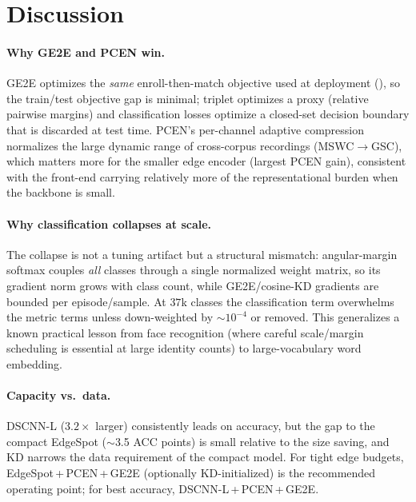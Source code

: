 \documentclass[10pt,twocolumn]{article}
\begin{document}
\section{Discussion}\label{sec:discuss}

\paragraph{Why GE2E and PCEN win.}
GE2E optimizes the \emph{same} enroll-then-match objective used at deployment
(), so the train/test objective gap is minimal; triplet
optimizes a proxy (relative pairwise margins) and classification losses optimize
a closed-set decision boundary that is discarded at test time. PCEN's
per-channel adaptive compression normalizes the large dynamic range of
cross-corpus recordings (MSWC$\to$GSC), which matters more for the smaller edge
encoder (largest PCEN gain), consistent with the front-end carrying relatively
more of the representational burden when the backbone is small.

\paragraph{Why classification collapses at scale.}
The collapse is not a tuning artifact but a structural mismatch: angular-margin
softmax couples \emph{all} classes through a single normalized weight matrix, so
its gradient norm grows with class count, while GE2E/cosine-KD gradients are
bounded per episode/sample. At $37$k classes the classification term overwhelms
the metric terms unless down-weighted by $\sim$$10^{-4}$ or removed. This
generalizes a known practical lesson from face recognition (where careful
scale/margin scheduling is essential at large identity counts) to large-vocabulary
word embedding.

\paragraph{Capacity vs.\ data.}
DSCNN-L ($3.2\times$ larger) consistently leads on accuracy, but the gap to the
compact EdgeSpot ($\sim$3.5 ACC points) is small relative to the size saving, and
KD narrows the data requirement of the compact model. For tight edge budgets,
EdgeSpot\,+\,PCEN\,+\,GE2E (optionally KD-initialized) is the recommended
operating point; for best accuracy, DSCNN-L\,+\,PCEN\,+\,GE2E.

\end{document}
